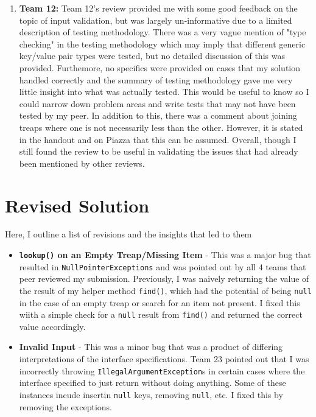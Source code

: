 \documentclass[11pt]{article}
\def\tt{\texttt}
\begin{document}
\begin{enumerate}
    \item \textbf{Team 12:} Team 12's review provided me with some good feedback on the topic of input validation, but was largely un-informative due to a limited description of testing methodology. There was a very vague mention of "type checking" in the testing methodology which may imply that different generic key/value pair types were tested, but no detailed discussion of this was provided. Furthemore, no specifics were provided on cases that my solution handled correctly and the summary of testing methodology gave me very little insight into what was actually tested. This would be useful to know so I could narrow down problem areas and write tests that may not have been tested by my peer. In addition to this, there was a comment about joining treaps where one is not necessarily less than the other. However, it is stated in the handout and on Piazza that this can be assumed. Overall, though I still found the review to be useful in validating the issues that had already been mentioned by other reviews.
\end{enumerate}
\newpage
\section{Revised Solution}
Here, I  outline a list of revisions and the insights that led to them
\begin{itemize}
    \item \textbf{\tt{lookup()} on an Empty Treap/Missing Item} - This was a major bug that resulted in \tt{NullPointerExceptions} and was pointed out by all $4$ teams that peer reviewed my submission. Previously, I was naively returning the value of the result of my helper method \tt{find()}, which had the potential of being \tt{null} in the case of an empty treap or search for an item not present. I fixed this wiith a simple check for a \tt{null} result from \tt{find()} and returned the correct value accordingly.
    \item \textbf{Invalid Input} - This was a minor bug that was a product of differing interpretations of the interface specifications. Team 23 pointed out that I was incorrectly throwing \tt{IllegalArgumentException}s in certain cases where the interface specified to just return without doing anything. Some of these instances incude insertin \tt{null} keys, removing \tt{null}, etc. I fixed this by removing the exceptions. 
    
    
\end{itemize}
\end{document}
